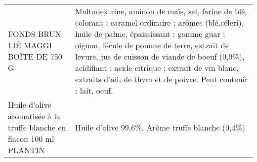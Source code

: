 \begin{longtable}{p{5cm}p{10cm}}
                                                                     FONDS BRUN LIÉ MAGGI BOÎTE DE 750 G  &                                                                                                                                                                                                                                                                                                                                                                                                                                                                                                                                                                                                                                                                  Maltodextrine, amidon de maïs, sel, farine de blé, colorant : caramel ordinaire ; arômes (blé,céleri), huile de palme, épaississant : gomme guar ; oignon, fécule de pomme de terre, extrait de levure, jus de cuisson de viande de boeuf (0,9\%), acidifiant : acide citrique ; extrait de vin blanc, extraits d'ail, de thym et de poivre. Peut contenir : lait, oeuf. \\
                                    Huile d'olive aromatisée à la truffe blanche en flacon 100 ml PLANTIN &                                                                                                                                                                                                                                                                                                                                                                                                                                                                                                                                                                                                                                                                                                                                                                                                                                                                                                                                                                                         Huile d'olive 99,6\%, Arôme truffe blanche (0,4\%) \\

\end{longtable}

